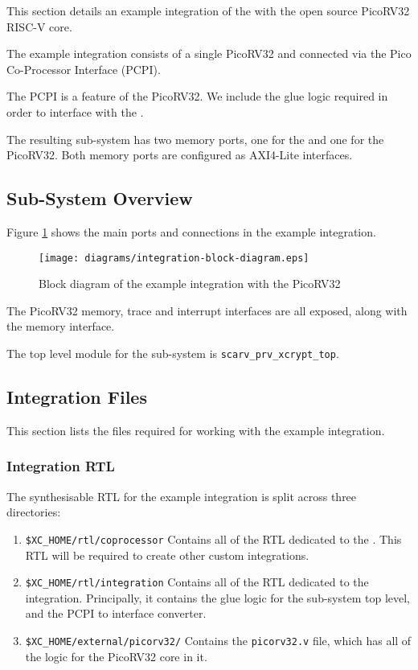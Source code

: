 
This section details an example integration of the \COP with
the open source PicoRV32 RISC-V core.

The example integration consists of a single PicoRV32 and \COP
connected via the Pico Co-Processor Interface (PCPI).

The PCPI is a feature of the PicoRV32.
We include the glue logic required in order to interface with the \COP.

The resulting sub-system has two memory ports, one for the \COP and one
for the PicoRV32.
Both memory ports are configured as AXI4-Lite interfaces.

\subsection{Sub-System Overview}

Figure \ref{fig:integration-block} shows the main ports and connections in
the example integration.

\begin{figure}[h]
\centering
\texttt{[image: diagrams/integration-block-diagram.eps]}
\caption{Block diagram of the example \COP integration with the PicoRV32}
\label{fig:integration-block}
\end{figure}

The PicoRV32 memory, trace and interrupt interfaces are all exposed, along
with the \COP memory interface.

The top level module for the sub-system is {\tt scarv\_prv\_xcrypt\_top}.


\subsection{Integration Files}

This section lists the files required for working with the example
integration.

\subsubsection{Integration RTL}

The synthesisable RTL for the example integration is split across three
directories:

\begin{enumerate}
\item {\tt \$XC\_HOME/rtl/coprocessor} Contains all of the RTL dedicated
    to the \COP.
    This RTL will be required to create other custom integrations.
\item {\tt \$XC\_HOME/rtl/integration} Contains all of the RTL dedicated
    to the integration.
    Principally, it contains the glue logic for the
    sub-system top level, and the PCPI to \COP interface converter.
\item {\tt \$XC\_HOME/external/picorv32/} Contains the {\tt picorv32.v}
    file, which has all of the logic for the PicoRV32 core in it.
\end{enumerate}

